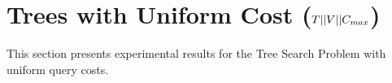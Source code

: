 \newpage
\section{Trees with Uniform Cost ($T || V || C_{max}$)}

This section presents experimental results for the Tree Search Problem with uniform query costs.



